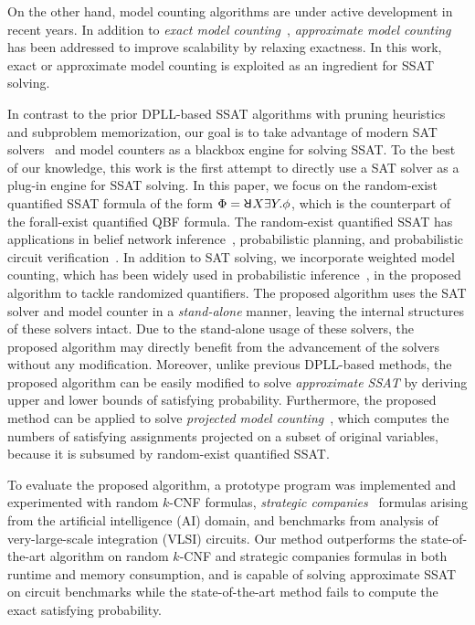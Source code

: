     On the other hand, model counting algorithms are under active development in recent years.
    In addition to \textit{exact model counting}~\cite{Sang2004,Sang2005ModelCounting},
    \textit{approximate model counting}~\cite{Gomes2006,Gomes2007,Chakraborty2016} has been addressed to improve scalability by relaxing exactness.
    In this work, exact or approximate model counting is exploited as an ingredient for SSAT solving.

    In contrast to the prior DPLL-based SSAT algorithms with pruning heuristics and subproblem memorization, our goal is to take advantage of modern SAT solvers~\cite{Een2003Solver,Een2003Incremental} and model counters as a blackbox engine for solving SSAT.
    To the best of our knowledge, this work is the first attempt to directly use a SAT solver as a plug-in engine for SSAT solving.
    In this paper, we focus on the random-exist quantified SSAT formula of the form $\Phi=\random{} X \exists Y.\phi$, which is the counterpart of the forall-exist quantified QBF formula.
    The random-exist quantified SSAT has applications in belief network inference~\cite{Cooper1990,Bacchus2003}, probabilistic planning, and probabilistic circuit verification~\cite{LeeTC18ProbDesign}.
    In addition to SAT solving, we incorporate weighted model counting, which has been widely used in probabilistic inference~\cite{Sang2005BayesianInference,Chavira2008}, in the proposed algorithm to tackle randomized quantifiers.
    The proposed algorithm uses the SAT solver and model counter in a \textit{stand-alone} manner, leaving the internal structures of these solvers intact.
    Due to the stand-alone usage of these solvers, the proposed algorithm may directly benefit from the advancement of the solvers without any modification.
    Moreover, unlike previous DPLL-based methods, the proposed algorithm can be easily modified to solve \textit{approximate SSAT} by deriving upper and lower bounds of satisfying probability.
    Furthermore, the proposed method can be applied to solve \textit{projected model counting}~\cite{Aziz2015}, which computes the numbers of satisfying assignments projected on a subset of original variables, because it is subsumed by random-exist quantified SSAT.

    To evaluate the proposed algorithm, a prototype program was implemented and experimented with random $k$-CNF formulas, \textit{strategic companies}~\cite{Cadoli1997} formulas arising from the artificial intelligence (AI) domain, and benchmarks from analysis of very-large-scale integration (VLSI) circuits.
    Our method outperforms the state-of-the-art algorithm on random $k$-CNF and strategic companies formulas in both runtime and memory consumption, and is capable of solving approximate SSAT on circuit benchmarks while the state-of-the-art method fails to compute the exact satisfying probability.


